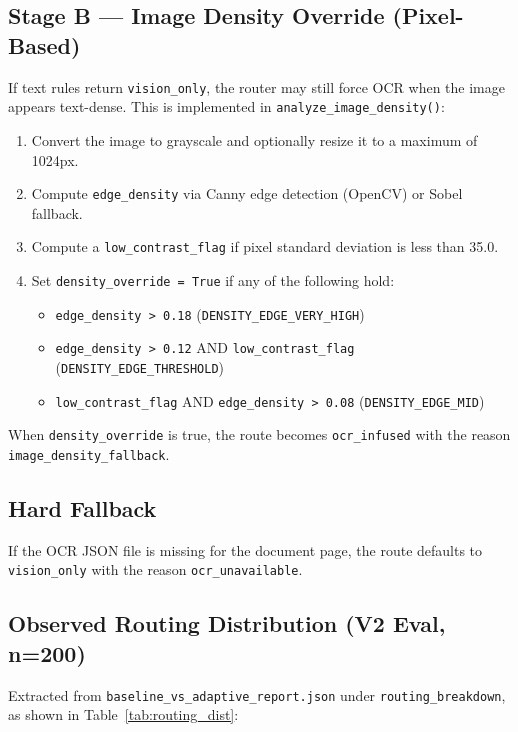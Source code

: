 \documentclass[11pt,a4paper]{article}
\begin{document}
\subsection{Stage B --- Image Density Override (Pixel-Based)}
If text rules return \texttt{vision\_only}, the router may still force OCR when the image appears text-dense. This is implemented in \texttt{analyze\_image\_density()}:
\begin{enumerate}
    \item Convert the image to grayscale and optionally resize it to a maximum of 1024px.
    \item Compute \texttt{edge\_density} via Canny edge detection (OpenCV) or Sobel fallback.
    \item Compute a \texttt{low\_contrast\_flag} if pixel standard deviation is less than 35.0.
    \item Set \texttt{density\_override = True} if any of the following hold:
    \begin{itemize}
        \item \texttt{edge\_density > 0.18} (\texttt{DENSITY\_EDGE\_VERY\_HIGH})
        \item \texttt{edge\_density > 0.12} AND \texttt{low\_contrast\_flag} (\texttt{DENSITY\_EDGE\_THRESHOLD})
        \item \texttt{low\_contrast\_flag} AND \texttt{edge\_density > 0.08} (\texttt{DENSITY\_EDGE\_MID})
    \end{itemize}
\end{enumerate}
When \texttt{density\_override} is true, the route becomes \texttt{ocr\_infused} with the reason \texttt{image\_density\_fallback}.

\subsection{Hard Fallback}
If the OCR JSON file is missing for the document page, the route defaults to \texttt{vision\_only} with the reason \texttt{ocr\_unavailable}.

\subsection{Observed Routing Distribution (V2 Eval, n=200)}
Extracted from \texttt{baseline\_vs\_adaptive\_report.json} under \texttt{routing\_breakdown}, as shown in Table~\ref{tab:routing_dist}:
\end{document}
